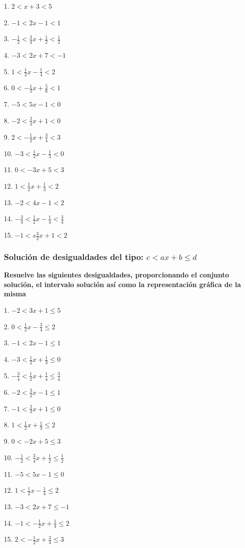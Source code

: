 \documentclass[12pt]{article}
\begin{document}
\begin{multicols}{2}
1. $2<x+3<5$

2. $-1<2x-1<1$

3. $-\frac{1}{2}<\frac{3}{4}x+\frac{1}{2}<\frac{1}{2}$

4. $-3< 2x+7<-1$

5. $1<\frac{1}{2}x-\frac{1}{4}<2$

6. $0<-\frac{1}{3}x+\frac{5}{6}<1$

7. $-5<5x-1<0$

8. $-2< \frac{2}{3}x+1<0$

9. $2<-\frac{1}{2}x+\frac{3}{4}<3$

10. $-3< \frac{1}{2}x-\frac{1}{3}<0$

11. $0< -3x+5<3$

12. $1<\frac{1}{2}x+\frac{1}{3}<2$

13. $-2< 4x-1<2$

14. $-\frac{3}{4}<\frac{1}{2}x-\frac{1}{4}<\frac{3}{4}$

15. $-1<s\frac{3}{2}x+1<2$
\end{multicols}

\subsubsection{\texorpdfstring{Solución de desigualdades del tipo:
\(c< ax+b \leq d\)}{Solución de desigualdades del tipo: c\textless{} ax+b \textbackslash leq d}}\label{soluciuxf3n-de-desigualdades-del-tipo-c-axb-leq-d}
\textbf{Resuelve las siguientes desigualdades, proporcionando el
conjunto solución, el intervalo solución así como la representación
gráfica de la misma}

\begin{multicols}{2}
1. $-2<3x+1\leq 5$

2. $0< \frac{1}{2}x-\frac{3}{4}\leq2$

3. $-1<2x-1\leq 1$

4. $-3< \frac{1}{2}x+\frac{1}{3}\leq 0$

5. $-\frac{3}{4}<\frac{1}{2}x+\frac{1}{4}\leq \frac{3}{4}$

6. $-2<\frac{3}{2}x-1\leq 1$

7. $-1<\frac{2}{3}x+1\leq 0$

8. $1<\frac{1}{2}x+\frac{1}{3}\leq 2$

9. $0< -2x+5\leq 3$

10. $-\frac{1}{2}<\frac{3}{4}x+\frac{1}{2}\leq \frac{1}{2}$

11. $-5<5x-1\leq 0$

12. $1<\frac{1}{2}x-\frac{1}{4}\leq 2$

13. $-3< 2x+7\leq -1$

14. $-1< -\frac{1}{2}x+\frac{1}{4}\leq 2$

15. $2<-\frac{1}{2}x+\frac{3}{4}\leq 3$
\end{multicols}
\end{document}
